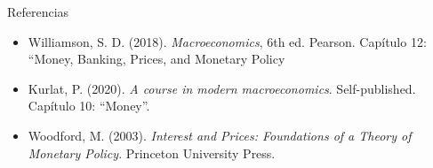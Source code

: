 \documentclass[aspectratio=169,11pt]{beamer}
\begin{document}
\begin{frame}{Referencias}
  \footnotesize
  \begin{itemize}
    \setlength{\itemsep}{0.65em}
    \item Williamson, S. D. (2018). \textit{Macroeconomics}, 6th ed. Pearson. Capítulo 12: ``Money, Banking, Prices, and Monetary Policy
    
    \item Kurlat, P. (2020). \textit{A course in modern macroeconomics}. Self-published. Capítulo 10: ``Money''.
        
    \item Woodford, M. (2003). \textit{Interest and Prices: Foundations of a Theory of Monetary Policy}. Princeton University Press.
  \end{itemize}
\end{frame}
\end{document}
